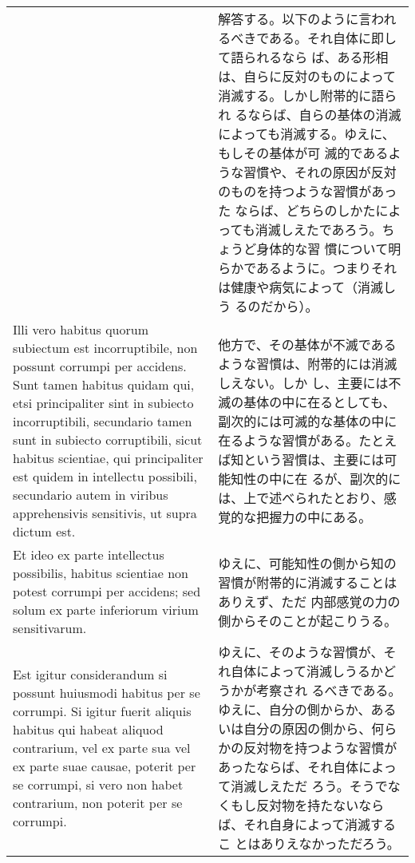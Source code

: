 \documentclass[10pt]{jsarticle} %
\begin{document}
\begin{longtable}{p{21em}p{21em}}
&

解答する。以下のように言われるべきである。それ自体に即して語られるなら
ば、ある形相は、自らに反対のものによって消滅する。しかし附帯的に語られ
るならば、自らの基体の消滅によっても消滅する。ゆえに、もしその基体が可
滅的であるような習慣や、それの原因が反対のものを持つような習慣があった
ならば、どちらのしかたによっても消滅しえたであろう。ちょうど身体的な習
慣について明らかであるように。つまりそれは健康や病気によって（消滅しう
るのだから）。

\\


Illi vero habitus quorum subiectum est incorruptibile, non possunt
corrumpi per accidens. Sunt tamen habitus quidam qui, etsi
principaliter sint in subiecto incorruptibili, secundario tamen sunt
in subiecto corruptibili, sicut habitus scientiae, qui principaliter
est quidem in intellectu possibili, secundario autem in viribus
apprehensivis sensitivis, ut supra dictum est.


&

他方で、その基体が不滅であるような習慣は、附帯的には消滅しえない。しか
し、主要には不滅の基体の中に在るとしても、副次的には可滅的な基体の中に
在るような習慣がある。たとえば知という習慣は、主要には可能知性の中に在
るが、副次的には、上で述べられたとおり、感覚的な把握力の中にある。


\\


Et ideo ex parte intellectus possibilis, habitus scientiae non potest
corrumpi per accidens; sed solum ex parte inferiorum virium
sensitivarum.



&

ゆえに、可能知性の側から知の習慣が附帯的に消滅することはありえず、ただ
内部感覚の力の側からそのことが起こりうる。

\\


Est igitur considerandum si possunt huiusmodi habitus per se
corrumpi. Si igitur fuerit aliquis habitus qui habeat aliquod
contrarium, vel ex parte sua vel ex parte suae causae, poterit per se
corrumpi, si vero non habet contrarium, non poterit per se corrumpi.


&

ゆえに、そのような習慣が、それ自体によって消滅しうるかどうかが考察され
るべきである。ゆえに、自分の側からか、あるいは自分の原因の側から、何ら
かの反対物を持つような習慣があったならば、それ自体によって消滅しえただ
ろう。そうでなくもし反対物を持たないならば、それ自身によって消滅するこ
とはありえなかっただろう。



\end{longtable}
\end{document}
